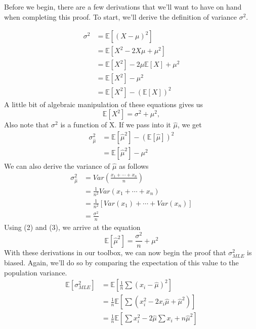 \documentclass[11pt,largemargins]{homework}
\begin{document}
\begin{alphaparts}
	Before we begin, there are a few derivations that we'll want to have on hand when completing this proof. To start, we'll derive the definition of variance $\sigma^2$.
	
	\begin{align*}
		\sigma^2&=\mathbb{E}\left[ {(X-\mu)}^2\right]\\
		&= \mathbb{E}[X^2-2X\mu+\mu^2]\\
		&= \mathbb{E}[X^2]-2\mu\mathbb{E}[X]+\mu^2\\
		&= \mathbb{E}[X^2]-\mu^2\\
		&= \mathbb{E}[X^2]-{(\mathbb{E}[X])}^2
	\end{align*}
	A little bit of algebraic manipulation of these equations gives us 
	\begin{equation}
		\mathbb{E}{[X^2]}=\sigma^2+\mu^2,
	\end{equation}
	Also note that $\sigma^2$ is a function of X. If we pass into it $\hat{\mu}$, we get
	\begin{align}
		\sigma_{\hat{\mu}}^2&=\mathbb{E}[\hat{\mu}^2]-{(\mathbb{E}[\hat{\mu}])}^2 \nonumber\\
		&=\mathbb{E}[\hat{\mu}^2]-{\mu}^2  
	\end{align}
	We can also derive the variance of $\hat{\mu}$ as follows
	\begin{align}
		\sigma_{\hat{\mu}}^2 &= Var(\frac{x_1+\cdots+x_n}{n}) \nonumber\\
		&=\frac{1}{n^2}Var(x_1+\cdots+x_n)\nonumber\\
		&=\frac{1}{n^2}[Var(x_1)+\cdots+Var(x_n)]\nonumber\\
		&=\frac{\sigma^2}{n}
	\end{align}
	Using (2) and (3), we arrive at the equation
	\begin{equation}
		\mathbb{E}\left[ \hat{\mu}^2\right]=\frac{\sigma^2}{n}+\mu^2
	\end{equation}
	With these derivations in our toolbox, we can now begin the proof that $\sigma^2_{MLE}$ is biased. Again, we'll do so by comparing the expectation of this value to the population variance.
	\begin{align}
		\mathbb{E}\left[ \sigma^2_{MLE}\right] &= \mathbb{E}\left[ \frac{1}{n}\sum{(x_i-\hat{\mu})}^2\right] \nonumber\\
		&= \frac{1}{n}\mathbb{E}\left[ \sum\left( x_i^2-2x_i\hat{\mu}+\hat{\mu}^2\right)\right]\nonumber\\
		&= \frac{1}{n}\mathbb{E}\left[ \sum x_i^2 -2\hat{\mu}\sum x_i+n\hat{\mu}^2\right]\nonumber\\

\end{align}
\end{alphaparts}
\end{document}
